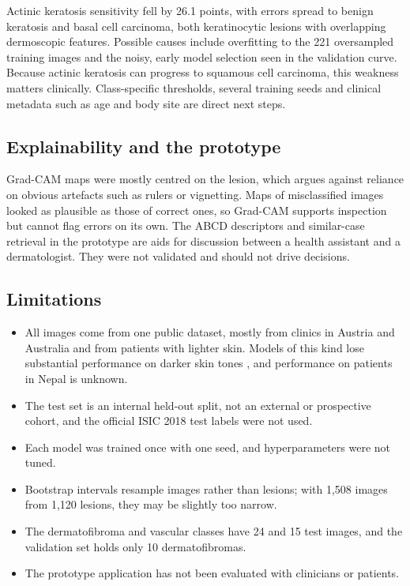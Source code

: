 \documentclass[11pt,a4paper]{article}
\begin{document}
Actinic keratosis sensitivity fell by 26.1 points, with errors spread to benign keratosis and basal cell carcinoma, both keratinocytic lesions with overlapping dermoscopic features. Possible causes include overfitting to the 221 oversampled training images and the noisy, early model selection seen in the validation curve. Because actinic keratosis can progress to squamous cell carcinoma, this weakness matters clinically. Class-specific thresholds, several training seeds and clinical metadata such as age and body site are direct next steps.

\subsection{Explainability and the prototype}
Grad-CAM maps were mostly centred on the lesion, which argues against reliance on obvious artefacts such as rulers or vignetting. Maps of misclassified images looked as plausible as those of correct ones, so Grad-CAM supports inspection but cannot flag errors on its own. The ABCD descriptors and similar-case retrieval in the prototype are aids for discussion between a health assistant and a dermatologist. They were not validated and should not drive decisions.

\subsection{Limitations}
\begin{itemize}
  \item All images come from one public dataset, mostly from clinics in Austria and Australia and from patients with lighter skin. Models of this kind lose substantial performance on darker skin tones \cite{daneshjou2022}, and performance on patients in Nepal is unknown.
  \item The test set is an internal held-out split, not an external or prospective cohort, and the official ISIC 2018 test labels were not used.
  \item Each model was trained once with one seed, and hyperparameters were not tuned.
  \item Bootstrap intervals resample images rather than lesions; with 1,508 images from 1,120 lesions, they may be slightly too narrow.
  \item The dermatofibroma and vascular classes have 24 and 15 test images, and the validation set holds only 10 dermatofibromas.
  \item The prototype application has not been evaluated with clinicians or patients.
\end{itemize}
\end{document}
